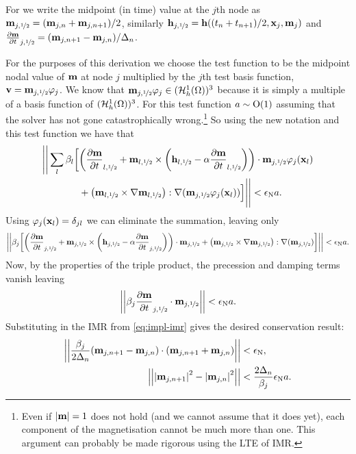 \newcommand{\mvmp}[1][j]{\mv_{{#1},\half}}
\newcommand{\hvmp}[1][j]{\hv_{{#1},\half}}
\newcommand{\dmmp}[1][j]{\dmdt_{{#1},\half}}

For  we write the midpoint (in time) value at the $j$th node as $ \mvmp = (\mv_{j,n} + \mv_{j,n+1})/2$,  similarly $\hvmp = \hv((t_n+t_{n+1})/2, \xv_j, \mv_j)$ and $\dmmp = (\mv_{j,n+1} - \mv_{j,n})/\dtn$.

For the purposes of this derivation we choose the test function to be the midpoint nodal value of $\boldsymbol{\mathrm{m}}$ at node $j$ multiplied by the $j$th test basis function, \ie $\testv = \mvmp \tbf_j$.
We know that $\mvmp\tbf_j \in  (\ts)^3$ because it is simply a multiple of a basis function of $({\mathcal{H}^1_h(\Omega)})^3$.
For this test function $a \sim \mathrm{O}{\left( 1 \right)}$ assuming that the solver has not gone catastrophically wrong.\footnote{Even if $\left|{\boldsymbol{\mathrm{m}}} \right|=1$ does not hold (and we cannot assume that it does yet), each component of the magnetisation cannot be much more than one. This argument can probably be made rigorous using the LTE of IMR.}
So using the new notation and this test function we have that
\begin{equation}
  \begin{aligned}
    \Bigg|\Bigg| \sum_l \beta_l \bigg[& \bigb{\dmmp[l] + \mvmp[l] \times \bigb{\hvmp[l] - \dampc \dmmp[l]}} \cdot \mvmp\tbf_j(\xv_l) \\
    &+ \bigb{\mvmp[l] \times \grad \mvmp[l]} : \grad (\mvmp \tbf_j(\xv_l)) \Big] \Bigg|\Bigg| < \ntol \sumbasiscoeff.
  \end{aligned}
\end{equation}
Using $\varphi_j(\boldsymbol{\mathrm{x}}_l) = \delta_{jl}$ we can eliminate the summation, leaving only
\begin{equation}
  \begin{aligned}
    \norm{\beta_j \bigg[ \bigb{\dmmp  + \mvmp \times \bigb{\hvmp  - \dampc \dmmp}} \cdot \mvmp
    + \bigb{\mvmp \times \grad \mvmp} : \grad (\mvmp)
    \bigg] } < \ntol \sumbasiscoeff.
  \end{aligned}
\end{equation}
Now, by the properties of the triple product, the precession and damping terms vanish leaving
\begin{equation}
  \norm{\beta_j \dmmp \cdot  \mvmp } < \ntol \sumbasiscoeff.
\end{equation}
Substituting in the IMR from \cref{eq:impl-imr} gives the desired conservation result:
\begin{equation}
  \begin{aligned}
    \left| \left| \frac{\beta_j}{2\Delta_{n}}(\boldsymbol{\mathrm{m}}_{j,n+1} - \boldsymbol{\mathrm{m}}_{j,n}) \cdot (\boldsymbol{\mathrm{m}}_{j, n+1} + \boldsymbol{\mathrm{m}}_{j, n}) \right| \right| &< \epsilon_{\mathrm{N}}, \\
    \left| \left| \left|{\boldsymbol{\mathrm{m}}_{j, n+1}} \right|^2 - \left|{\boldsymbol{\mathrm{m}}_{j, n}} \right|^2 \right| \right| &< \frac{2\Delta_{n}}{\beta_j} \epsilon_{\mathrm{N}} a.
  \end{aligned}
\end{equation}

